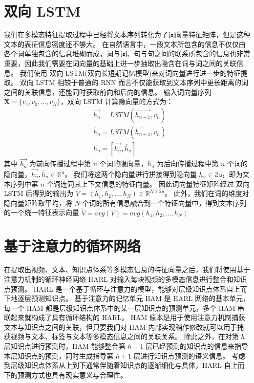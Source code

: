 \section{双向 LSTM}
    我们在多模态特征提取过程中已经将文本序列转化为了词向量特征矩阵，但是这种文本的表征信息密度还不够大。
    在自然语言中，一段文本所包含的信息不仅仅由各个词单独包含的信息堆砌而成，词与词、句与句之间的联系所包含的信息也非常重要，因此我们需要在词向量的基础上进一步抽取出隐含在词与词之间的关联信息。
    我们使用 双向 LSTM\cite{Hochreiter1997LongSM}(双向长短期记忆模型)来对词向量进行进一步的特征提取。
    双向 LSTM 相较于普通的 RNN 而言不仅能获取到文本序列中更长距离的词之间的关联信息，还能同时获取前向和后向的信息。
    输入词向量序列 $\boldsymbol{X} = \{v_1, v_2, \dots, v_N\}$，双向 LSTM 计算隐向量的方式为：
    \begin{equation}
        \begin{aligned}
            &\overrightarrow{h_{n}} = LSTM\left(\overrightarrow{h_{n - 1}}, v_n\right) \\
            &\overleftarrow{h_{n}} = LSTM\left(\overleftarrow{h_{n + 1}}, v_n\right) \\
            &h_n = [\overrightarrow{h_n}, \overleftarrow{h_n}]
        \end{aligned}
    \end{equation}
    其中 $\overrightarrow{h_{n}}$ 为前向传播过程中第 $n$ 个词的隐向量，$\overleftarrow{h_{n}}$ 为后向传播过程中第 $n$ 个词的隐向量，$\overrightarrow{h_{n}}, \overleftarrow{h_{n}} \in \mathbb{R}^{u}$。
    我们将这两个隐向量进行拼接得到隐向量 $h_n \in \mathbb{2u}$，即为文本序列中第 $n$ 个词连同其上下文信息的特征向量。
    因此词向量特征矩阵经过 双向 LSTM 后得到的输出为 $V = (h_1, h_2, \dots, h_N) \in \mathbb{R}^{N \times 2u}$。
    此外，我们在词的维度对隐向量矩阵取平均，将 $N$ 个词的所有信息融合到一个特征向量中，得到文本序列的一个统一特征表示向量 $\tilde{V} = avg(V) = avg(h_1, h_2, \dots, h_N)$


\section{基于注意力的循环网络}
    在提取出视频、文本、知识点体系等多模态信息的特征向量之后，我们将使用基于注意力机制的循环神经网络 HARL\cite{Huang2019HierarchicalMT} 对输入每块视频的多模态信息进行整合和知识点预测。
    HARL 是一个基于循环与注意力的模型，能够对层级知识点体系自上而下地逐层预测知识点。
    基于注意力的记忆单元 HAM 是 HARL 网络的基本单元，每一个 HAM 都是层级知识点体系中的某一层知识点的预测单元，多个 HAM 串联起来就构成了具有循环结构的 HARL。
    HAM 原本是用于使用注意力机制捕获文本与知识点之间的关联，但只要我们对 HAM 内部实现稍作修改就可以用于捕获视频与文本、标签与文本等多模态信息之间的关联关系。
    除此之外，在对第 $h$ 层知识点进行预测时，HAM 能够整合第 $h - 1$ 层已经预测的知识点的信息来指导本层知识点的预测，同时生成指导第 $h + 1$ 层进行知识点预测的语义信息。
    考虑到层级知识点体系从上到下通常伴随着知识点的逐渐细化与具体，HARL 自上而下的预测方式也具有现实意义与合理性。


